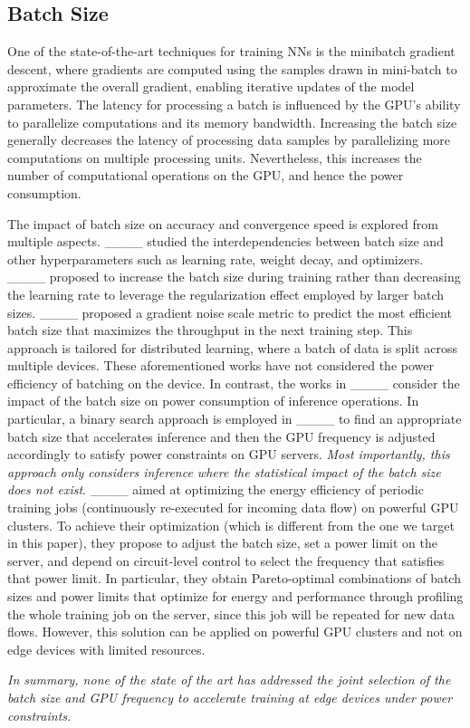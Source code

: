 \subsection{Batch Size} 
One of the state-of-the-art techniques for training \acp{NN} is the minibatch gradient descent, where gradients are computed using the samples drawn in mini-batch to approximate the overall gradient, enabling iterative updates of the model parameters. 
The latency for processing a batch is influenced by the GPU's ability to parallelize computations and its memory bandwidth. 
Increasing the batch size generally decreases the latency of processing data samples by parallelizing more computations on multiple processing units. 
Nevertheless, this increases the number of computational operations on the GPU, and hence the power consumption. 

The impact of batch size on accuracy and convergence speed is explored from multiple aspects. ____ studied the interdependencies between batch size and other hyperparameters such as learning rate, weight decay, and optimizers. 
____  proposed to increase the batch size during training rather than decreasing the learning rate to leverage the regularization effect employed by larger batch sizes.  ____ proposed a gradient noise scale metric to predict the most efficient batch size that maximizes the throughput in the next training step. This approach is tailored for distributed learning, where a batch of data is split across multiple devices.
These aforementioned works have not considered the power efficiency of batching on the device. 
%
In contrast, the works in ____ consider the impact of the batch size on power consumption of inference operations. In particular, a binary search approach is employed in ____ to find an appropriate batch size that accelerates inference and then the GPU frequency is adjusted accordingly to satisfy power constraints on GPU servers. \textit{Most importantly, this approach only considers inference where the statistical impact of the batch size does not exist}.
____ aimed at optimizing the energy efficiency of periodic training jobs (continuously re-executed for incoming data flow) on powerful GPU clusters. To achieve their optimization (which is different from the one we target in this paper), they propose to adjust the batch size, set a power limit on the server, and depend on circuit-level control to select the frequency that satisfies that power limit.
In particular, they obtain Pareto-optimal combinations of batch sizes and power limits that optimize for energy and performance through profiling the whole training job on the server, since this job will be repeated for new data flows. However, this solution can be applied on powerful GPU clusters and not on edge devices with limited resources. 

\textit{
In summary, none of the state of the art has addressed the joint selection of the batch size and GPU frequency to accelerate training at edge devices under power constraints.}